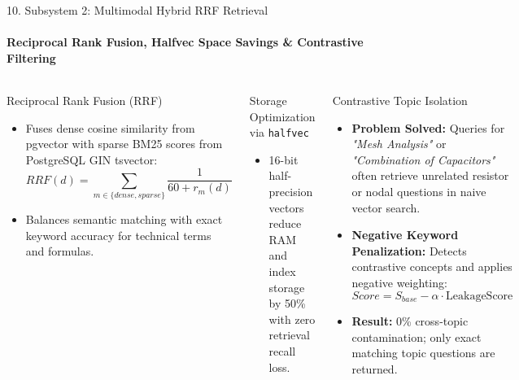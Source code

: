 \documentclass[aspectratio=169, 11pt]{beamer}
\begin{document}
\begin{frame}{10. Subsystem 2: Multimodal Hybrid RRF Retrieval}
    \framesubtitle{Reciprocal Rank Fusion, Halfvec Space Savings \& Contrastive Filtering}
    \begin{columns}[T]
        \begin{block}{Reciprocal Rank Fusion (RRF)}
            \footnotesize
            \begin{itemize}
                \item Fuses dense cosine similarity from pgvector with sparse BM25 scores from PostgreSQL GIN tsvector:
                \[ RRF(d) = \sum_{m \in \{dense, sparse\}} \frac{1}{60 + r_m(d)} \]
                \item Balances semantic matching with exact keyword accuracy for technical terms and formulas.
            \end{itemize}
        \end{block}

        \begin{block}{Storage Optimization via \texttt{halfvec}}
            \footnotesize
            \begin{itemize}
                \item 16-bit half-precision vectors reduce RAM and index storage by 50\% with zero retrieval recall loss.
            \end{itemize}
        \end{block}

        \begin{block}{Contrastive Topic Isolation}
            \footnotesize
            \begin{itemize}
                \item \textbf{Problem Solved:} Queries for \textit{"Mesh Analysis"} or \textit{"Combination of Capacitors"} often retrieve unrelated resistor or nodal questions in naive vector search.
                \item \textbf{Negative Keyword Penalization:} Detects contrastive concepts and applies negative weighting:
                \[ Score = S_{base} - \alpha \cdot \text{LeakageScore} \]
                \item \textbf{Result:} 0\% cross-topic contamination; only exact matching topic questions are returned.
            \end{itemize}
        \end{block}
    \end{columns}
\end{frame}
\end{document}
